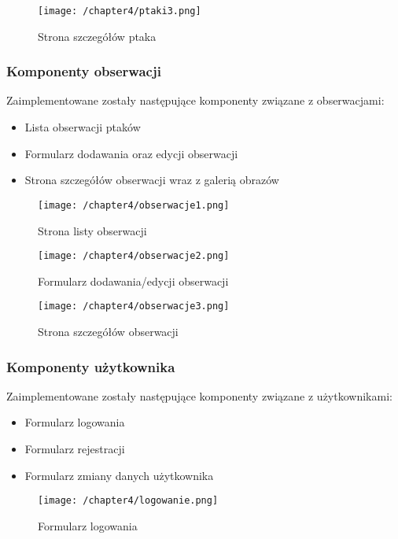 \begin{figure}[!htb]
	\centering
	\texttt{[image: /chapter4/ptaki3.png]}
	\caption{Strona szczegółów ptaka}
	\label{fig:ptaki3}
\end{figure}

\subsubsection{Komponenty obserwacji}
Zaimplementowane zostały następujące komponenty związane z obserwacjami:
\begin{itemize}
	\item Lista obserwacji ptaków
	\item Formularz dodawania oraz edycji obserwacji
	\item Strona szczegółów obserwacji wraz z galerią obrazów
\end{itemize}

\begin{figure}[!hb]
	\centering
	\texttt{[image: /chapter4/obserwacje1.png]}
	\caption{Strona listy obserwacji}
	\label{fig:obserwacje1}
\end{figure}

\begin{figure}[!hb]
	\centering
	\texttt{[image: /chapter4/obserwacje2.png]}
	\caption{Formularz dodawania/edycji obserwacji}
	\label{fig:obserwacje2}
\end{figure}

\begin{figure}[!htb]
	\centering
	\texttt{[image: /chapter4/obserwacje3.png]}
	\caption{Strona szczegółów obserwacji}
	\label{fig:obserwacje3}
\end{figure}

\subsubsection{Komponenty użytkownika}
Zaimplementowane zostały następujące komponenty związane z użytkownikami:
\begin{itemize}
	\item Formularz logowania
	\item Formularz rejestracji
	\item Formularz zmiany danych użytkownika
\end{itemize}

\begin{figure}[!htb]
	\centering
	\texttt{[image: /chapter4/logowanie.png]}
	\caption{Formularz logowania}
	\label{figlogowanie}
\end{figure}

